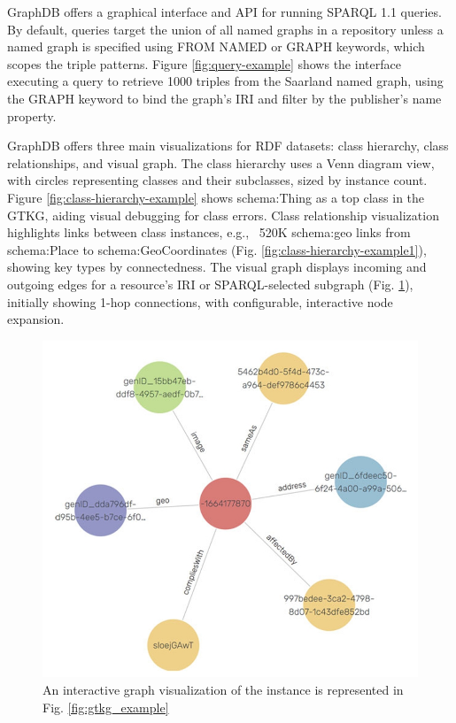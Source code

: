 \documentclass[12pt]{article}
\begin{document}
GraphDB offers a graphical interface and API for running SPARQL 1.1 queries. By default, queries target the union of all named graphs in a repository unless a named graph is specified using FROM NAMED or GRAPH keywords, which scopes the triple patterns. Figure \ref{fig:query-example} shows the interface executing a query to retrieve 1000 triples from the Saarland named graph, using the GRAPH keyword to bind the graph’s IRI and filter by the publisher’s name property.

GraphDB offers three main visualizations for RDF datasets: class hierarchy, class relationships, and visual graph. The class hierarchy uses a Venn diagram view, with circles representing classes and their subclasses, sized by instance count. Figure \ref{fig:class-hierarchy-example} shows schema:Thing as a top class in the GTKG, aiding visual debugging for class errors. Class relationship visualization highlights links between class instances, e.g., ~520K schema:geo links from schema:Place to schema:GeoCoordinates (Fig. \ref{fig:class-hierarchy-example1}), showing key types by connectedness. The visual graph displays incoming and outgoing edges for a resource’s IRI or SPARQL-selected subgraph (Fig. \ref{fig:class-hierarchy-example2}), initially showing 1-hop connections, with configurable, interactive node expansion.
\begin{figure}
    \includegraphics[width=\linewidth]{imgs/19.10.jpeg}
    \caption{An interactive graph visualization of the instance is represented in Fig. \ref{fig:gtkg_example}}
    \label{fig:class-hierarchy-example2}
\end{figure}
\end{document}
